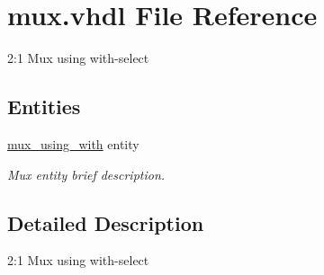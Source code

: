 \hypertarget{mux_8vhdl}{\section{mux.\-vhdl File Reference}
\label{mux_8vhdl}
}


2\-:1 Mux using with-\/select  


\subsection*{Entities}
\begin{DoxyCompactItemize}
\item 
\hyperlink{classmux__using__with}{mux\-\_\-using\-\_\-with} entity
\begin{DoxyCompactList}\small\item\em Mux entity brief description. \end{DoxyCompactList}\end{DoxyCompactItemize}


\subsection{Detailed Description}
2\-:1 Mux using with-\/select 